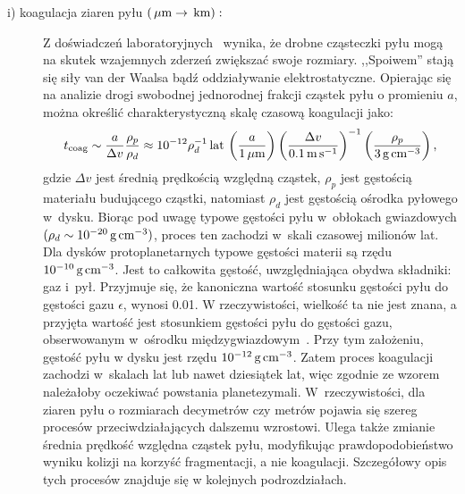 \begin{description}
   \item[i) koagulacja ziaren pyłu $\left(\hbox{$\thinspace\mu\textrm{m}$} \rightarrow \hbox{$\thinspace\textrm{km}$}\right):$] 
      Z doświadczeń laboratoryjnych~\cite{BW08} wynika, że \linebreak drobne
      cząsteczki pyłu mogą na skutek wzajemnych zderzeń zwiększać swoje
      rozmiary. ,,Spoiwem'' stają się siły van der Waalsa bądź oddziaływanie
      elektrostatyczne. Opierając się na analizie drogi swobodnej jednorodnej
      frakcji cząstek pyłu o promieniu $a$, można określić charakterystyczną
      skalę czasową koagulacji jako:
%
   \begin{equation}\label{coag} 
      t_{\textrm{coag}} %
      \sim \frac{a}{\Delta v}\frac{\rho_p}{\rho_d} \approx 
      10^{-12} \rho_d^{-1}\yr\thinspace
      \left(\frac{a}{1\mum}\right)
      \left(\frac{\Delta v}{0.1\m\s^{-1}}\right)^{-1}
      \left(\frac{\rho_p}{3\g\cm^{-3}}\right),
   \end{equation}
%
   gdzie $\Delta v$ jest średnią prędkością względną cząstek, $\rho_p$ jest
   gęstością materiału budującego cząstki, natomiast $\rho_d$ jest gęstością
   ośrodka pyłowego w~dysku.  Biorąc pod uwagę typowe gęstości pyłu w~obłokach
   gwiazdowych $(\rho_d \sim 10^{-20}\hbox{$\thinspace\textrm{g}$}\hbox{$\thinspace\textrm{cm}$}^{-3})$, proces ten zachodzi w~skali
   czasowej milionów lat. Dla dysków protoplanetarnych typowe gęstości materii
   są rzędu $10^{-10}\hbox{$\thinspace\textrm{g}$}\hbox{$\thinspace\textrm{cm}$}^{-3}$. Jest to całkowita gęstość, uwzględniająca
   obydwa składniki: gaz i~pył. Przyjmuje się, że kanoniczna wartość stosunku
   gęstości pyłu do gęstości gazu $\epsilon$, wynosi 0.01. W rzeczywistości,
   wielkość ta nie jest znana, a przyjęta wartość jest stosunkiem gęstości pyłu
   do gęstości gazu, obserwowanym w~ośrodku międzygwiazdowym~\cite{FS03}. Przy
   tym założeniu, gęstość pyłu w dysku jest rzędu $10^{-12}\hbox{$\thinspace\textrm{g}$}\hbox{$\thinspace\textrm{cm}$}^{-3}$. Zatem
   proces koagulacji zachodzi w~skalach lat lub nawet dziesiątek lat, więc
   zgodnie ze wzorem~ należałoby oczekiwać powstania planetezymali.
   W~rzeczywistości, dla ziaren pyłu o rozmiarach decymetrów czy metrów pojawia
   się szereg procesów przeciwdziałających dalszemu wzrostowi. Ulega także
   zmianie średnia prędkość względna cząstek pyłu, modyfikując
   prawdopodobieństwo wyniku kolizji na korzyść fragmentacji, a nie
   koagulacji. Szczegółowy opis tych procesów znajduje się w kolejnych
   podrozdziałach.


\end{description}
